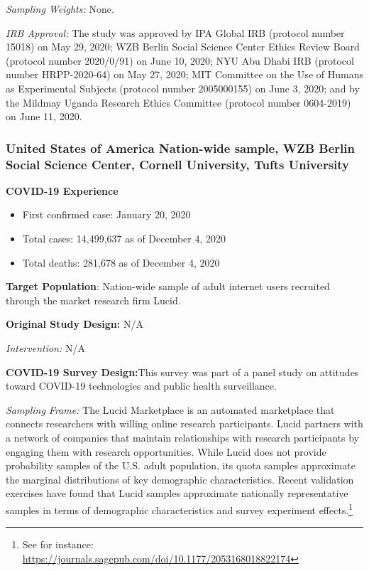 \documentclass[
  12pt,
]{article}
\begin{document}
\emph{Sampling Weights:} None.

\emph{IRB Approval:} The study was approved by IPA Global IRB (protocol number 15018) on May 29, 2020; WZB Berlin Social Science Center Ethics Review Board (protocol number 2020/0/91) on June 10, 2020; NYU Abu Dhabi IRB (protocol number HRPP-2020-64) on May 27, 2020; MIT Committee on the Use of Humans as Experimental Subjects (protocol number 2005000155) on June 3, 2020; and by the Mildmay Uganda Research Ethics Committee (protocol number 0604-2019) on June 11, 2020.

\hypertarget{united-states-of-america-nation-wide-sample-wzb-berlin-social-science-center-cornell-university-tufts-university}{%
\subsubsection*{United States of America Nation-wide sample, WZB Berlin Social Science Center, Cornell University, Tufts University}\label{united-states-of-america-nation-wide-sample-wzb-berlin-social-science-center-cornell-university-tufts-university}}

\textbf{COVID-19 Experience}

\begin{itemize}
        \item First confirmed case: January 20, 2020
        \item Total cases:  14,499,637 as of December 4, 2020 
        \item Total deaths:  281,678 as of December 4, 2020 
\end{itemize}

\textbf{Target Population}: Nation-wide sample of adult internet users recruited through the market research firm Lucid.

\textbf{Original Study Design:} N/A

\emph{Intervention:} N/A

\textbf{COVID-19 Survey Design:}This survey was part of a panel study on attitudes toward COVID-19 technologies and public health surveillance.

\emph{Sampling Frame:} The Lucid Marketplace is an automated marketplace that connects researchers with willing online research participants. Lucid partners with a network of companies that maintain relationships with research participants by engaging them with research opportunities. While Lucid does not provide probability samples of the U.S. adult population, its quota samples approximate the marginal distributions of key demographic characteristics. Recent validation exercises have found that Lucid samples approximate nationally representative samples in terms of demographic characteristics and survey experiment effects.\footnote{See for instance: \url{https://journals.sagepub.com/doi/10.1177/2053168018822174}}
\end{document}

